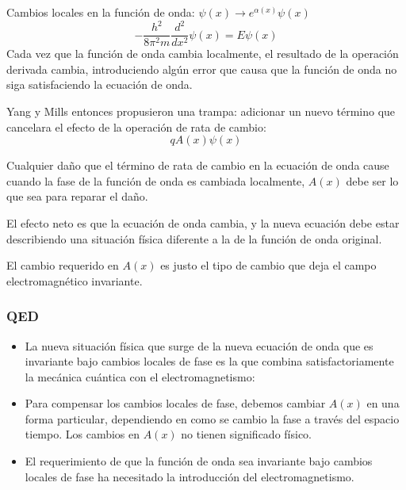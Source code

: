 \documentclass[%
xcolor=pdftex,dvipsnames,table%
]{beamer}
\begin{document}
\begin{frame}[plain]
  \begin{block}{Cambios locales en la función de onda: $\psi(x)\to e^{\alpha(x)}\psi(x)$}
    \begin{equation*}
      -\frac{h^2}{8\pi^2m}\frac{d^2}{dx^2}\psi(x)=E\psi(x)
    \end{equation*}
Cada vez que la función de onda cambia localmente, el resultado de la operación derivada cambia, introduciendo algún error que causa que la función de onda no siga satisfaciendo la ecuación de onda.

Yang y Mills entonces propusieron una trampa: adicionar un nuevo término que cancelara el efecto de la operación de rata de cambio:
\begin{equation*}
  q A(x)\psi(x)
\end{equation*}

Cualquier daño que el término de rata de cambio en la ecuación de onda cause cuando la fase de la función de onda es cambiada localmente, $A(x)$ debe ser lo que sea para reparar el daño.

El efecto neto es que la ecuación de onda cambia, y la nueva ecuación debe estar describiendo una situación física diferente a la de la función de onda original.

El cambio requerido en $A(x)$ es justo el tipo de cambio que deja el campo electromagnético invariante.
  \end{block}
\end{frame}
\begin{frame}[allowframebreaks]
  \frametitle{QED}
  \begin{itemize}
  \item   La nueva situación física que surge de la nueva ecuación de onda que es invariante bajo cambios locales de fase es la que combina satisfactoriamente la mecánica cuántica con el electromagnetismo:

  \item Para compensar los cambios locales de fase, debemos cambiar $A(x)$ en una forma particular, dependiendo en como se cambio la fase a través del espacio tiempo. Los cambios en $A(x)$ no tienen significado físico.

  \item El requerimiento de que la función de onda sea invariante bajo cambios locales de fase ha necesitado la introducción del electromagnetismo.

  \end{itemize}
\end{frame}
\end{document}
